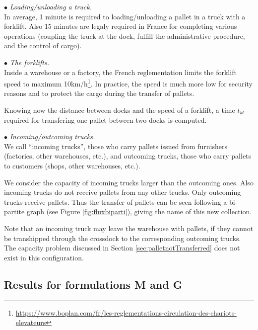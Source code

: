 \documentclass[preprint,12pt,authoryear]{elsarticle}
\begin{document}
\noindent
$\bullet$ \textit{Loading/unloading a truck.}\\
%
In average, 1 minute is required to loading/unloading a pallet in a truck with a forklift.
%
Also 15 minutes are legaly required in France for completing various operations (coupling the truck at the dock, fulfill the administrative procedure, and the control of cargo).


\bigskip
\noindent
$\bullet$ \textit{The forklifts.}\\
% 
Inside a warehouse or a factory, the French reglementation limits the forklift speed to maximum 10km/h\footnote{\url{https://www.boplan.com/fr/les-reglementations-circulation-des-chariots-elevateurs}}.
%
In practice, the speed is much more low for security reasons and to protect the cargo during the transfer of pallets.

Knowing now the distance between docks and the speed of a forklift, a time $t_{kl}$ required for transfering one pallet between two docks is computed.


\bigskip
\noindent
$\bullet$ \textit{Incoming/outcoming trucks.}\\
%
We call ``incoming trucks'', those who carry pallets issued from furnishers (factories, other warehouses, etc.), and outcoming trucks, those who carry pallets to customers (shops, other warehouses, etc.).

We consider the capacity of incoming trucks larger than the outcoming ones. Also incoming trucks do not receive pallets from any other trucks. Only outcoming trucks receive pallets. Thus the transfer of pallets can be seen following a bi-partite graph (see Figure \ref{fig:fluxbiparti}), giving the name of this new collection. 

Note that an incoming truck may leave the warehouse with pallets, if they cannot be transhipped through the crossdock to the corresponding outcoming trucks.
The capacity problem discussed in Section \ref{sec:palletnotTransferred} does not exist in this configuration.


\newpage


%
%
\subsection{Results for formulations M and G}
\label{app:ResultatsMG}

\end{document}
